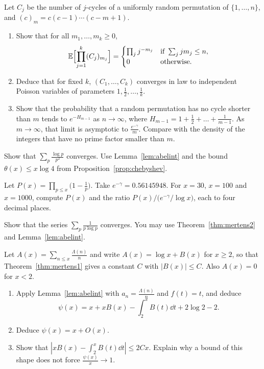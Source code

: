 \begin{exercise}[$\star\star\star$]\label{pb:poissoncycles}
Let $C_j$ be the number of $j$-cycles of a uniformly random permutation of $\{1,\dots,n\}$, and $(c)_m=c(c-1)\cdots(c-m+1)$.
\begin{enumerate}[label=(\alph*)]
\item Show that for all $m_1,\dots,m_k\ge 0$,
\[
\mathbb E\Bigl[\prod_{j=1}^k(C_j)_{m_j}\Bigr]=\begin{cases}\prod_jj^{-m_j}&\text{if }\sum_jjm_j\le n,\\0&\text{otherwise.}\end{cases}
\]
\item Deduce that for fixed $k$, $(C_1,\dots,C_k)$ converges in law to independent Poisson variables of parameters $1,\frac12,\dots,\frac1k$.
\item Show that the probability that a random permutation has no cycle shorter than $m$ tends to $e^{-H_{m-1}}$ as $n\to\infty$, where $H_{m-1}=1+\frac12+\dots+\frac1{m-1}$. As $m\to\infty$, that limit is asymptotic to $\frac{e^{-\gamma}}m$. Compare with the density of the integers that have no prime factor smaller than $m$.
\end{enumerate}
\end{exercise}

\begin{exercise}[$\star$]\label{ex:m6a}
Show that $\sum_p\frac{\log p}{p^2}$ converges. Use Lemma~\ref{lem:abelint} and the bound $\theta(x)\le x\log 4$ from Proposition~\ref{prop:chebyshev}.
\end{exercise}

\begin{exercise}[$\star\star$]\label{ex:m6b}
Let $P(x)=\prod_{p\le x}\bigl(1-\frac1p\bigr)$. Take $e^{-\gamma}=0.56145948$. For $x=30$, $x=100$ and $x=1000$, compute $P(x)$ and the ratio $P(x)\big/\bigl(e^{-\gamma}/\log x\bigr)$, each to four decimal places.
\end{exercise}

\begin{exercise}[$\star\star$]\label{ex:m6c}
Show that the series $\sum_p\frac1{p\log p}$ converges. You may use Theorem~\ref{thm:mertens2} and Lemma~\ref{lem:abelint}.
\end{exercise}

\begin{exercise}[$\star\star\star$]\label{ex:m6d}
Let $A(x)=\sum_{n\le x}\frac{\Lambda(n)}n$ and write $A(x)=\log x+B(x)$ for $x\ge 2$, so that Theorem~\ref{thm:mertens1} gives a constant $C$ with $|B(x)|\le C$. Also $A(x)=0$ for $x<2$.
\begin{enumerate}[label=(\alph*)]
\item Apply Lemma~\ref{lem:abelint} with $a_n=\frac{\Lambda(n)}n$ and $f(t)=t$, and deduce
\[
\psi(x)=x+xB(x)-\int_2^x B(t)\dd t+2\log 2-2.
\]
\item Deduce $\psi(x)=x+O(x)$.
\item Show that $|xB(x)-\int_2^x B(t)\dd t|\le 2Cx$. Explain why a bound of this shape does not force $\frac{\psi(x)}x\to 1$.
\end{enumerate}
\end{exercise}

